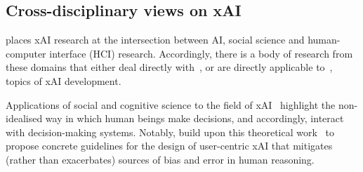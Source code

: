 





\subsection{Cross-disciplinary views on xAI}

\citet{miller2019explanation} places xAI research at the intersection between AI, social science and human-computer interface (HCI) research. Accordingly, there is a body of research from these domains that either deal directly with~\cite{abdul2020cogam, holzinger2013human}, or are directly applicable to~\cite{nielsen2005ten}, topics of xAI development.

Applications of social and cognitive science to the field of xAI~\cite{de2017people, miller2019explanation, lipton2018mythos, jussupow2021augmenting} highlight the non-idealised way in which human beings make decisions, and accordingly, interact with decision-making systems. Notably, \citet{wang_designing_2019} build upon this theoretical work~\cite{hoffman2017explainingpart1,hoffman2017explainingpart2, klein2018explainingpart3, hoffman2018explainingpart4} to propose concrete guidelines for the design of user-centric xAI that mitigates (rather than exacerbates) sources of bias and error in human reasoning.

